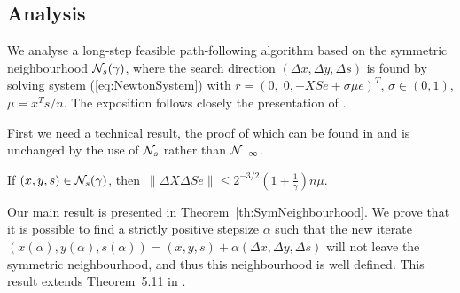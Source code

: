 %
%
\subsection{Analysis}

We analyse a long-step feasible path-following 
algorithm based on the symmetric neighbourhood $\mathcal{N}_s(\gamma)$, 
where the search direction $(\Delta x, \Delta y, \Delta s)$ 
is found by solving system (\ref{eq:NewtonSystem}) with 
$r=(0,\; 0,-XSe+\sigma\mu e)^T$, $\sigma\in(0,1)$, $\mu=x^Ts/n$.
%
The exposition follows closely the presentation of 
\cite[Chapter~5]{ipm:Wright97}. 

First we need a technical result, the proof of which can be found 
in \cite[Lemma~5.10]{ipm:Wright97} and is unchanged by the use 
of $\mathcal{N}_s$ rather than $\mathcal{N}_{-\infty}$.
%
\begin{lemma} \label{Wright:5.10}
If $(x,y,s)\in \mathcal{N}_s(\gamma)$, then\,
\(
  \|\Delta X\Delta Se\| \le 2^{-3/2}\left( 1+ \displaystyle{\frac{1}{\gamma}} \right)n\mu.
\)
\end{lemma}

Our main result is presented in Theorem~\ref{th:SymNeighbourhood}. 
We prove that it is possible to find a strictly positive stepsize 
$\alpha$ such that the new iterate 
$(x(\alpha),y(\alpha),s(\alpha))=(x,y,s)+\alpha(\Delta x,\Delta y,\Delta s)$
will not leave the symmetric neighbourhood, and thus this 
neighbourhood is well defined. This result extends 
Theorem~5.11 in \cite{ipm:Wright97}.

